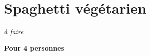 \documentclass[10pt,a4paper]{report}
\begin{document}
    \section{Spaghetti végétarien}

    \begin{multicols}{2}
        \parbox[1cm]{\textwidth}{
            \begin{description}
                \item \textit{à faire}
            \end{description}
        }
        \columnbreak

        \newline
        \textbf{Pour 4 personnes}
    \end{multicols}
\end{document}
